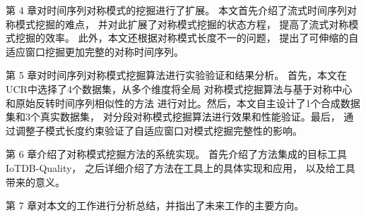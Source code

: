 第 4 章对时间序列对称模式的挖掘进行了扩展。
本文首先介绍了流式时间序列对称模式挖掘的难点，
并对此扩展了对称模式挖掘的状态方程，
提高了流式对称模式挖掘的效率。
此外，本文还根据对称模式长度不一的问题，
提出了可伸缩的自适应窗口挖掘更加完整的对称时间序列。

第 5 章对时间序列对称模式挖掘算法进行实验验证和结果分析。
首先，本文在UCR中选择了4个数据集，从多个维度将全局
对称模式挖掘算法与基于对称中心和原始反转时间序列相似性的方法
进行对比。然后，本文自主设计了1个合成数据集和3个真实数据集，
对分段对称模式挖掘算法进行效果和性能验证。最后，
通过调整子模式长度约束验证了自适应窗口对模式挖掘完整性的影响。

第 6 章介绍了对称模式挖掘方法的系统实现。
首先介绍了方法集成的目标工具 IoTDB-Quality，
之后详细介绍了方法在工具上的具体实现和应用，
以及给工具带来的意义。

第 7 章对本文的工作进行分析总结，并指出了未来工作的主要方向。 
